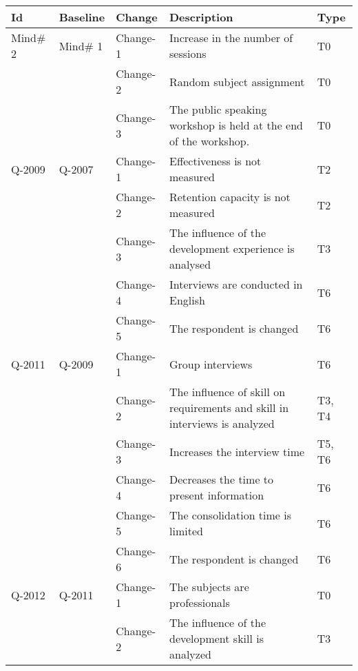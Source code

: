 
\begin{table}

\label{tab:1}       %
\begin{minipage}{6cm}

\begin{tabular}{| l | l | l |p{6.5cm} |  l |}
\hline
\textbf{Id} & \textbf{Baseline} & \textbf{Change}  & \textbf{Description}& \textbf{Type}\\
\hline
 Mind\# 2 & Mind\# 1  & Change-1 & Increase in the number of sessions & T0 \\
~ & ~ & Change-2 & Random subject assignment & T0 \\
~ & ~ & Change-3 & The public speaking workshop is held at the end of the workshop. & T0 \\ \hline \hline
Q-2009 & Q-2007 & Change-1 & Effectiveness is not measured  & T2 \\
~ & ~ & Change-2 & Retention capacity is not measured  & T2 \\
~ & ~ & Change-3 & The influence of the development experience is analysed  & T3 \\
~ & ~ & Change-4 & Interviews are conducted in English  & T6 \\
~ & ~ & Change-5 & The respondent is changed  & T6 \\ \hline
Q-2011 & Q-2009 & Change-1 & Group interviews  & T6 \\
~ & ~ & Change-2 & The influence of skill on requirements and skill in interviews is analyzed  & T3, T4 \\
~ & ~ & Change-3 & Increases the interview time  & T5, T6 \\
~ & ~ & Change-4 & Decreases the time to present information  & T6 \\
~ & ~ & Change-5 & The consolidation time is limited  & T6 \\
~ & ~ & Change-6 & The respondent is changed  & T6 \\ \hline
Q-2012 & Q-2011 & Change-1 & The subjects are professionals  & T0 \\
~ & ~ & Change-2 & The influence of the development skill is analyzed  & T3 \\

\end{tabular}
\end{minipage}
\end{table}
